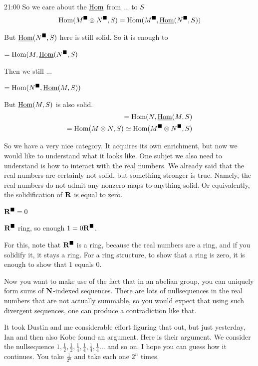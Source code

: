 \begin{unfinished}{21:00}
So we care about the $\operatorname{\underline{Hom}}$ from ... to $S$
\begin{align*}
\operatorname{Hom}(M^\blacksquare \otimes N^\blacksquare, S) = \operatorname{Hom}(M^\blacksquare, \operatorname{\underline{Hom}}(N^\blacksquare,S))
\end{align*}

But $\operatorname{\underline{Hom}}(N^\blacksquare,S)$ here is still solid.
So it is enough to 

$ = \operatorname{Hom}(M, \operatorname{\underline{Hom}}(N^\blacksquare,S)$

Then we still ...

$ = \operatorname{Hom}(N^\blacksquare, \operatorname{\underline{Hom}}(M,S))$

But $\operatorname{\underline{Hom}}(M,S)$ is also solid. 
\begin{align*}
=\operatorname{Hom}(N, \operatorname{\underline{Hom}}(M,S) \\
=\operatorname{Hom}(M \otimes N, S) \simeq \operatorname{Hom}(M^\blacksquare \otimes N^\blacksquare, S)
\end{align*}

So we have a very nice category. It acquires its own enrichment, but now we would like to understand what it looks like. One subjet we also need to understand is how to interact with the real numbers. We already said that the real numbers are certainly not solid, but something stronger is true. Namely, the real numbers do not admit any nonzero maps to anything solid. Or equivalently, the solidification of $\mathbf R$ is equal to zero.

\begin{lemma}
$\mathbf R^\blacksquare = 0$
\end{lemma}

\begin{sketch}
$\mathbf R^\blacksquare$ ring, so enough $1=0 \mathbf R^\blacksquare$.

\end{sketch}

%
For this, note that $\mathbf R^\blacksquare$ is a ring, because the real numbers are a ring, and if you solidify it, it stays a ring. For a ring structure, to show that a ring is zero, it is enough to show that $1$ equals $0$. 

%
Now you want to make use of the fact that in an abelian group, you can uniquely form sums of $\mathbf N$-indexed sequences. There are lots of nullsequences in the real numbers that are not actually summable, so you would expect that using such divergent sequences, one can produce a contradiction like that.

It took Dustin and me considerable effort figuring that out, but just yesterday, Ian and then also Kobe found an argument. Here is their argument. We consider the nullsequence $1, \frac{1}{2}, \frac{1}{2}, \frac{1}{4}, \frac{1}{4}, \frac{1}{4}, \frac{1}{4} \ldots$ and so on. I hope you can guess how it continues. You take $\frac{1}{2^n}$ and take each one $2^n$ times.


\end{unfinished}
